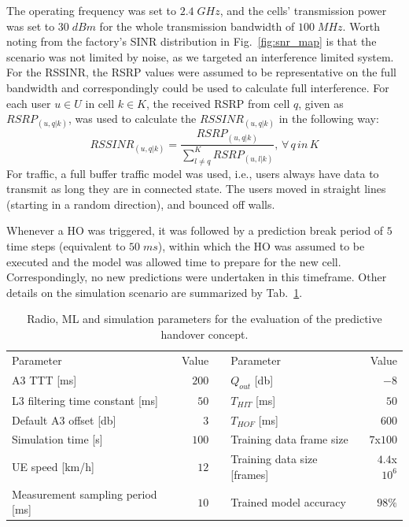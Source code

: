 			The operating frequency was set to $2.4\;GHz$, and the cells’ transmission power was set to $30\;dBm$ for the whole transmission bandwidth of $100\;MHz$.
			Worth noting from the factory’s \ac{SINR} distribution in Fig.~\ref{fig:snr_map} is that the scenario was not limited by noise, as we targeted an interference limited system.	
			For the \ac{RSSINR}, the \ac{RSRP} values were assumed to be representative on the full bandwidth and correspondingly could be used to calculate full interference.
			For each user $u \in U$ in cell $k \in K$, the received \ac{RSRP} from cell $q$, given as $RSRP_(u,q|k)$, was used to calculate the $RSSINR_(u,q|k)$ in the following way:
			\begin{equation}\label{eq:rs_sinr}
				RSSINR_(u,q|k) = \dfrac{RSRP_(u,q|k)}{\sum_{l\ne{q}}^{K}RSRP_(u,l|k)},\,\forall\,{q\,in\,K}
			\end{equation}
			For traffic, a full buffer traffic model was used, i.e., users always have data to transmit as long they are in connected state.
			The users moved in straight lines (starting in a random direction), and bounced off walls. 
		
			Whenever a \ac{HO} was triggered, it was followed by a prediction break period of $5$ time steps (equivalent to $50\;ms$), within which the \ac{HO} was assumed to be executed and the model was allowed time to prepare for the new cell.
			Correspondingly, no new predictions were undertaken in this timeframe.
			Other details on the simulation scenario are summarized by Tab.~\ref{tab:pred_ho_sim_params}.
			
			\begin{table}[h]
				\renewcommand*{\arraystretch}{1.2}
				\centering
				\begin{tabular}{l|r c l|r}			
					Parameter 							& Value	&	& Parameter						& Value		\\
					\cline{1-2}\cline{4-5}
					A3 \ac{TTT} [ms]					& $200$	&	& $Q_{out}$ [db]				& $-8$		\\
					L3 filtering time constant [ms]		& $50$	&	& $T_{HIT}$ [ms]				& $50$		\\
					Default A3 offset [db]				& $3$	&	& $T_{HOF}$ [ms]				& $600$		\\
					Simulation time [s]					& $100$	&	& Training data frame size		& $7$x$100$	\\
					\ac{UE} speed [km/h]				& $12$	&	& Training data size [frames]	& $4.4$x$10^6$	\\
					Measurement sampling period [ms]	& $10$	&	& Trained model accuracy		& $98\%$		\\
				\end{tabular} 
				\caption[Parameters of the simulation in the predictive handover evaluation]{Radio, ML and simulation parameters for the evaluation of the predictive handover concept.}
				\label{tab:pred_ho_sim_params}
			\end{table}
		
